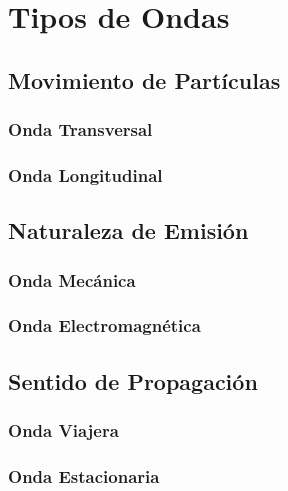 \chapter{Tipos de Ondas}%
\section{Movimiento de Partículas}
\subsection{Onda Transversal} \label{lbl-transversal}

\subsection{Onda Longitudinal} \label{lbl-longitudinal}

\section{Naturaleza de Emisión}
\subsection{Onda Mecánica} \label{lbl-mecanica}

\subsection{Onda Electromagnética} \label{lbl-electromagnetica}

\section{Sentido de Propagación}
\subsection{Onda Viajera}

\subsection{Onda Estacionaria}

